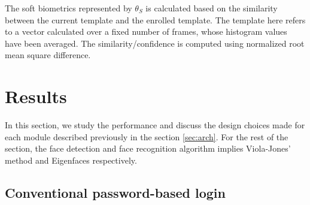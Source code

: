 \documentclass[%
        submission,
        notitlepage,
        narroweqnarray,
        inline,
        ]{ieee}
\begin{document}
The soft biometrics represented by $\theta_{S}$ is calculated based on the similarity between the current template and the enrolled template.
The template here refers to a vector calculated over a fixed number of frames, whose histogram values have been averaged.
The similarity/confidence is computed using normalized root mean square difference.
 
\section{Results}
In this section, we study the performance and discuss the design choices made for each module described previously in the section \ref{sec:arch}.
For the rest of the section, the face detection and face recognition algorithm implies Viola-Jones' method and Eigenfaces respectively.

\subsection{Conventional password-based login}
\begin{figure}
	\centering
	\quad
\end{figure}
\end{document}
